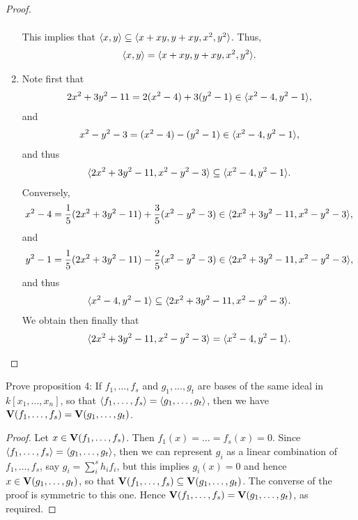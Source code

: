 \begin{proof}
\begin{enumerate}
\begin{align*}
        \end{align*}
        This implies that $\langle x,y\rangle \subseteq \langle x+xy, y+xy, x^2, y^2\rangle$. Thus,
        \begin{align*}
            \langle x,y\rangle = \langle x+xy, y+xy, x^2, y^2\rangle.
        \end{align*}
        \item Note first that
        \begin{align*}
            2x^2 + 3y^2 - 11 = 2(x^2 - 4) + 3(y^2 - 1)\in \langle x^2 - 4, y^2 - 1\rangle,
        \end{align*}
        and
        \begin{align*}
            x^2 - y^2 - 3 = (x^2 - 4) - (y^2 - 1)\in \langle x^2 - 4, y^2 - 1\rangle,
        \end{align*}
        and thus
        \begin{align*}
            \langle 2x^2 + 3y^2 - 11, x^2 - y^2 - 3\rangle \subseteq \langle x^2 - 4, y^2 -1\rangle.
        \end{align*}
        Conversely,
        \begin{align*}
            x^2 - 4 = \frac{1}{5}(2x^2 + 3y^2 - 11) + \frac{3}{5}(x^2 - y^2 - 3)\in \langle 2x^2 + 3y^2 - 11, x^2 - y^2 - 3\rangle,
        \end{align*}
        and
        \begin{align*}
            y^2 -1 = \frac{1}{5}(2x^2 + 3y^2 - 11) - \frac{2}{5}(x^2 - y^2 - 3)\in \langle 2x^2 + 3y^2 - 11, x^2 - y^2 - 3\rangle,
        \end{align*}
        and thus
        \begin{align*}
            \langle x^2 - 4, y^2 -1\rangle\subseteq \langle 2x^2 + 3y^2 - 11, x^2 - y^2 - 3\rangle.
        \end{align*}
        We obtain then finally that
        \begin{align*}
            \langle 2x^2 + 3y^2 - 11, x^2 - y^2 - 3\rangle = \langle x^2 - 4, y^2 -1\rangle.
        \end{align*}
    \end{enumerate}
\end{proof}

\begin{exercise}{4}
Prove proposition 4: 
If $f_1,\dots,f_s$ and $g_1,\dots,g_t$ are bases of the same ideal in $k[x_1,\dots,x_n]$, so that $\langle f_1,\dots,f_s\rangle = \langle g_1,\dots,g_t\rangle$, then we have $\mathbf{V}(f_1,\dots,f_s) = \mathbf{V}(g_1,\dots,g_t)$.
\end{exercise}
\begin{proof}
Let $x\in \mathbf{V}(f_1,\dots,f_s)$. 
Then $f_1(x) = \dots = f_s(x) = 0$. 
Since $\langle f_1,\dots,f_s\rangle = \langle g_1,\dots,g_t\rangle$, then we can represent $g_i$ as a linear combination of $f_1,\dots,f_s$, say $g_i = \sum_i^sh_if_i$, but this implies $g_i(x) = 0$ and hence $x\in\mathbf{V}(g_1,\dots,g_t)$, so that $\mathbf{V}(f_1,\dots,f_s)\subseteq\mathbf{V}(g_1,\dots,g_t)$. 
The converse of the proof is symmetric to this one. 
Hence $\mathbf{V}(f_1,\dots,f_s) = \mathbf{V}(g_1,\dots,g_t)$, as required.
\end{proof}

